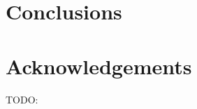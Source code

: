 \documentclass[letterpaper]{sig-alternate}
\begin{document}
\section{Conclusions}



\section{Acknowledgements}
 \cite{harper2005economic}
 TODO:


\end{document}
